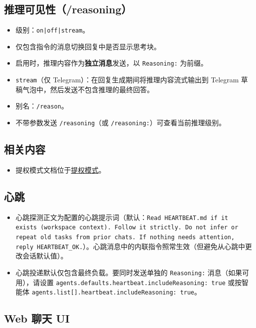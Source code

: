 \subsection{推理可见性（/reasoning）}


\begin{itemize}
  \item 级别：\texttt{on|off|stream}。
  \item 仅包含指令的消息切换回复中是否显示思考块。
  \item 启用时，推理内容作为\textbf{独立消息}发送，以 \texttt{Reasoning:} 为前缀。
  \item \texttt{stream}（仅 Telegram）：在回复生成期间将推理内容流式输出到 Telegram 草稿气泡中，然后发送不包含推理的最终回答。
  \item 别名：\texttt{/reason}。
  \item 不带参数发送 \texttt{/reasoning}（或 \texttt{/reasoning:}）可查看当前推理级别。
\end{itemize}


\subsection{相关内容}


\begin{itemize}
  \item 提权模式文档位于\href{/tools/elevated}{提权模式}。
\end{itemize}


\subsection{心跳}


\begin{itemize}
  \item 心跳探测正文为配置的心跳提示词（默认：\texttt{Read HEARTBEAT.md if it exists (workspace context). Follow it strictly. Do not infer or repeat old tasks from prior chats. If nothing needs attention, reply HEARTBEAT\_OK.}）。心跳消息中的内联指令照常生效（但避免从心跳中更改会话默认值）。
  \item 心跳投递默认仅包含最终负载。要同时发送单独的 \texttt{Reasoning:} 消息（如果可用），请设置 \texttt{agents.defaults.heartbeat.includeReasoning: true} 或按智能体 \texttt{agents.list[].heartbeat.includeReasoning: true}。
\end{itemize}


\subsection{Web 聊天 UI}


